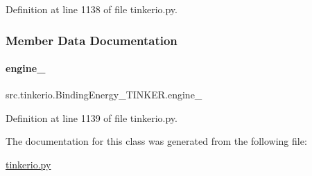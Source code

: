 Definition at line 1138 of file tinkerio.\+py.



\subsubsection{Member Data Documentation}
\mbox{\label{classsrc_1_1tinkerio_1_1BindingEnergy__TINKER_a92ac44cf220acb8699075c83afb66ae5}} 
\paragraph{\texorpdfstring{engine\+\_\+}{engine\_}}
{\footnotesize\ttfamily src.\+tinkerio.\+Binding\+Energy\+\_\+\+T\+I\+N\+K\+E\+R.\+engine\+\_\+}



Definition at line 1139 of file tinkerio.\+py.



The documentation for this class was generated from the following file\+:\begin{DoxyCompactItemize}
\item 
\hyperlink{tinkerio_8py}{tinkerio.\+py}\end{DoxyCompactItemize}

